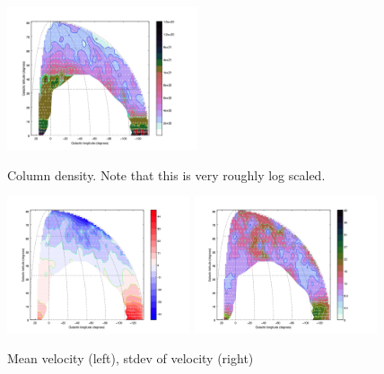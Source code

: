 \documentclass[10pt]{article}
\begin{document}
\begin{figure}[!ht]
    \centering
    \includegraphics[width=0.5\textwidth]{plots/col_density.jpg} \\
    \caption{Column density.  Note that this is very roughly log scaled.}
    \label{fig:colrho}
\end{figure}
\begin{figure}[!ht]
    \centering
    \includegraphics[width=0.48\textwidth]{plots/veloc_mean.jpg}
    \includegraphics[width=0.48\textwidth]{plots/veloc_std.jpg} \\
    \caption{Mean velocity (left), stdev of velocity (right)}
    \label{fig:velocs}
\end{figure}
\end{document}
